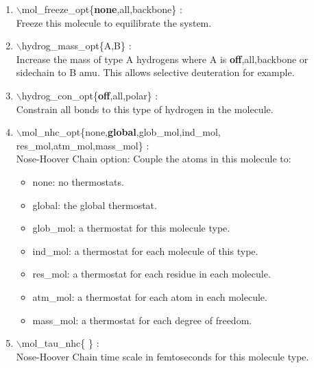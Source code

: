 \begin{itemize}
\begin{enumerate}
 \vspace{0.15in} \Large
 \item  $\backslash$mol\_freeze\_opt\{{\bf none},all,backbone\} : \\
    \large
    Freeze this molecule to equilibrate the system.

 \vspace{0.15in} \Large
 \item  $\backslash$hydrog\_mass\_opt\{A,B\} : \\
    \large
   Increase the mass of type A hydrogens where A is 
   {\bf off},all,backbone or sidechain to B amu. This allows
   selective deuteration for example.

 \vspace{0.15in} \Large
 \item  $\backslash$hydrog\_con\_opt\{{\bf off},all,polar\} : \\
    \large
   Constrain all bonds to this type of hydrogen in the molecule.

 \vspace{0.15in} \Large
 \item  $\backslash$mol\_nhc\_opt\{none,{\bf global},glob\_mol,ind\_mol,\\ 
                 \hspace*{0.5in}res\_mol,atm\_mol,mass\_mol\} :  \\
    \large
   Nose-Hoover Chain option: Couple the atoms in this molecule to:
      \begin{itemize}
         \item none:     no thermostats.
         \item global:   the global thermostat.
         \item glob\_mol: a thermostat for this molecule type. 
         \item ind\_mol:  a thermostat for each molecule of this type. 
         \item res\_mol:  a thermostat for each residue in each molecule.
         \item atm\_mol:  a thermostat for each atom in each molecule.
         \item mass\_mol: a thermostat for each degree of freedom.
      \end{itemize}

 \vspace{0.15in} \Large
 \item  $\backslash$mol\_tau\_nhc\{ \} : \\
    \large
   Nose-Hoover Chain time scale in femtoseconds for this molecule type.


\end{enumerate}
\end{itemize}
